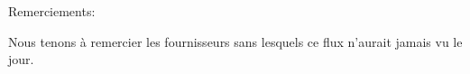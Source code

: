 \begin{flushleft}
Remerciements:\\
\end{flushleft}

\begin{center}
Nous tenons à remercier les fournisseurs sans lesquels ce flux n'aurait jamais vu le jour.\\
\end{center}